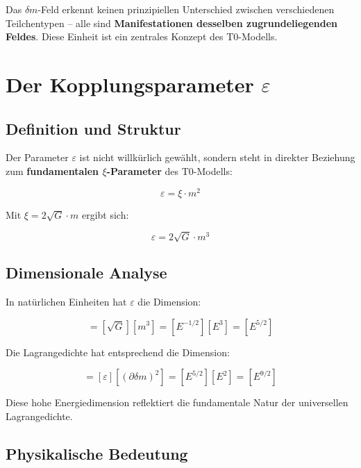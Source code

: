 \documentclass[12pt,a4paper]{report}
\begin{document}
	Das $\delta m$-Feld erkennt keinen prinzipiellen Unterschied zwischen verschiedenen Teilchentypen -- alle sind \textbf{Manifestationen desselben zugrundeliegenden Feldes}. Diese Einheit ist ein zentrales Konzept des T0-Modells.
	
	\section{Der Kopplungsparameter $\varepsilon$}
	
	\subsection{Definition und Struktur}
	
	Der Parameter $\varepsilon$ ist nicht willkürlich gewählt, sondern steht in direkter Beziehung zum \textbf{fundamentalen $\xi$-Parameter} des T0-Modells:
	
	\begin{equation}
		\varepsilon = \xi \cdot m^2
	\end{equation}
	
	Mit $\xi = 2\sqrt{G} \cdot m$ ergibt sich:
	
	\begin{equation}
		\varepsilon = 2\sqrt{G} \cdot m^3
	\end{equation}
	
	\subsection{Dimensionale Analyse}
	
	In natürlichen Einheiten hat $\varepsilon$ die Dimension:
	
	\begin{equation}
		[\varepsilon] = [\sqrt{G}][m^3] = [E^{-1/2}][E^3] = [E^{5/2}]
	\end{equation}
	
	Die Lagrangedichte hat entsprechend die Dimension:
	
	\begin{equation}
		[\mathcal{L}] = [\varepsilon][(\partial\delta m)^2] = [E^{5/2}][E^2] = [E^{9/2}]
	\end{equation}
	
	Diese hohe Energiedimension reflektiert die fundamentale Natur der universellen Lagrangedichte.
	
	\subsection{Physikalische Bedeutung}
	
\end{document}
